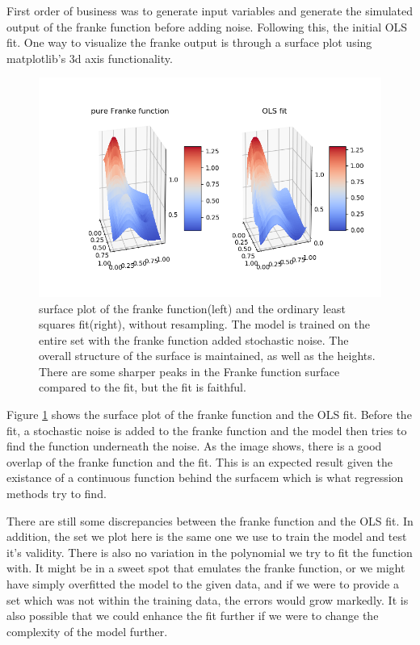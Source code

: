 \documentclass[ 12pt, a4paper ]{article}
\begin{document}
First order of business was to generate input variables and generate the simulated output of
the franke function before adding noise. Following this, the initial OLS fit. One way to 
visualize the franke output is through a surface plot using matplotlib's 3d axis functionality.

\begin{figure}
\includegraphics[scale=0.6]{frankesurface.png}
\caption{
    surface plot of the franke function(left) and the ordinary least squares fit(right), 
    without resampling. The model is trained on the entire set with the franke function 
    added stochastic noise.
    The overall structure of the surface is maintained, as well as the heights. There are 
    some sharper peaks in the Franke function surface compared to the fit, but the fit is
    faithful.
}
\label{fig:frankesurface}
\end{figure}

Figure \ref{fig:frankesurface} shows the surface plot of the franke function and the OLS fit. 
Before the fit, a stochastic noise is added to the franke function and the model then tries to
find the function underneath the noise. As the image shows, there is a good overlap of the 
franke function and the fit. This is an expected result given the existance of a continuous 
function behind the surfacem which is what regression methods try to find. 

There are still some discrepancies between the franke function and the OLS fit. In addition, the 
set we plot here is the same one we use to train the model and test it's validity. There is also 
no variation in the polynomial we try to fit the function with. It might be in a sweet spot that 
emulates the franke function, or we might have simply overfitted the model to the given data, 
and if we were to provide a set which was not within the training data, the errors would grow
markedly. It is also possible that we could enhance the fit further if we were to change the 
complexity of the model further.
\end{document}
